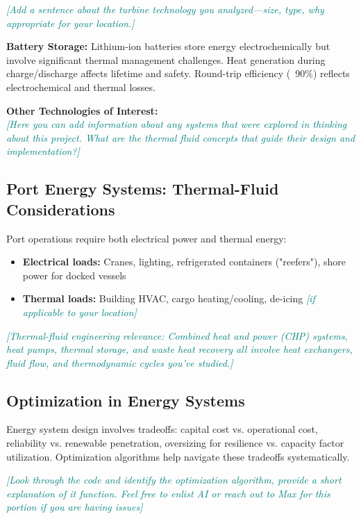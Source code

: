 \documentclass[11pt,letterpaper]{article}
\newcommand{\hint}[1]{\textcolor{teal}{\small\textit{[#1]}}}
\begin{document}
\hint{Add a sentence about the turbine technology you analyzed—size, type, why appropriate for your location.}

\textbf{Battery Storage:} Lithium-ion batteries store energy electrochemically but involve significant thermal management challenges. Heat generation during charge/discharge affects lifetime and safety. Round-trip efficiency (~90\%) reflects electrochemical and thermal losses.

\textbf{Other Technologies of Interest:} \\
\hint{Here you can add information about any systems that were explored in thinking about this project. What are the thermal fluid concepts that guide their design and implementation?}

\subsection{Port Energy Systems: Thermal-Fluid Considerations}

Port operations require both electrical power and thermal energy:
\begin{itemize}
    \item \textbf{Electrical loads:} Cranes, lighting, refrigerated containers ("reefers"), shore power for docked vessels
    \item \textbf{Thermal loads:} Building HVAC, cargo heating/cooling, de-icing \hint{if applicable to your location}
\end{itemize}

\hint{Thermal-fluid engineering relevance: Combined heat and power (CHP) systems, heat pumps, thermal storage, and waste heat recovery all involve heat exchangers, fluid flow, and thermodynamic cycles you've studied.}

\subsection{Optimization in Energy Systems}

Energy system design involves tradeoffs: capital cost vs. operational cost, reliability vs. renewable penetration, oversizing for resilience vs. capacity factor utilization. Optimization algorithms help navigate these tradeoffs systematically.

\hint{Look through the code and identify the optimization algorithm, provide a short explanation of it function. Feel free to enlist AI or reach out to Max for this portion if you are having issues}
\end{document}
